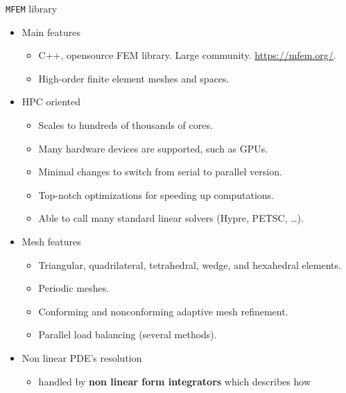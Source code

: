 \documentclass{beamer}
\begin{document}
\begin{frame}[fragile]{\texttt{MFEM} library}
\begin{itemize}
\item
  Main features
  \begin{itemize}
  \item
    C++, opensource FEM library. Large community. \hspace*{2mm} {\small \url{https://mfem.org/}}.
  \item
    High-order finite element meshes and spaces.
  \end{itemize}
\end{itemize}
\vspace*{1mm}
\begin{itemize}
\item  HPC oriented
 \begin{itemize}
  \item
    Scales to hundreds of thousands of cores.
  \item
    Many hardware devices are supported, such as GPUs.
  \item
    Minimal changes to switch from serial to parallel version.
  \item
    Top-notch optimizations for speeding up computations.
  \item
    Able to call many standard linear solvers (Hypre, PETSC, \ldots).
  \end{itemize}
\end{itemize}
\vspace*{1mm}
\begin{itemize}
\item
  Mesh features
  \begin{itemize}
  \item
    Triangular, quadrilateral, tetrahedral, wedge, and hexahedral
    elements.
  \item
    Periodic meshes.
  \item
    Conforming and nonconforming adaptive mesh refinement.
  \item
    Parallel load balancing (several methods).
  \end{itemize}
\end{itemize}
\vspace*{1mm}
\begin{itemize}
\item
  Non linear PDE's resolution
  \begin{itemize}
  \item
    handled by \textbf{non linear form integrators} which describes how

\end{itemize}
\end{itemize}
\end{frame}
\end{document}
